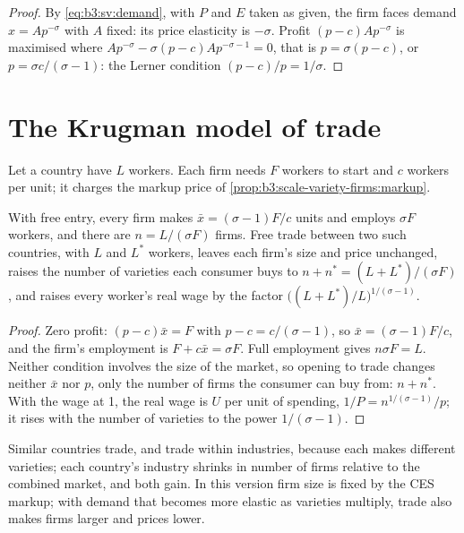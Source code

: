 \begin{proof}
By \eqref{eq:b3:sv:demand}, with $P$ and $E$ taken as given, the firm faces demand
$x = A p^{-\sigma}$ with $A$ fixed: its price elasticity is $-\sigma$. Profit
$(p - c)Ap^{-\sigma}$ is maximised where $Ap^{-\sigma} - \sigma(p - c)Ap^{-\sigma - 1} = 0$,
that is $p = \sigma(p - c)$, or $p = \sigma c/(\sigma - 1)$: the Lerner condition $(p -
c)/p = 1/\sigma$.
\end{proof}

\section{The Krugman model of trade}\label{sec:b3:scale-variety-firms:krugman}

Let a country have $L$ workers. Each firm needs $F$ workers to start and $c$
workers per unit; it charges the markup price of
\cref{prop:b3:scale-variety-firms:markup}.

\begin{proposition}\label{prop:b3:scale-variety-firms:krugman}
With free entry, every firm makes $\bar x = (\sigma - 1)F/c$ units and employs
$\sigma F$ workers, and there are $n = L/(\sigma F)$ firms. Free trade between two
such countries, with $L$ and $L^*$ workers, leaves each firm's size and price
unchanged, raises the number of varieties each consumer buys to $n + n^* = (L +
L^*)/(\sigma F)$, and raises every worker's real wage by the factor $\bigl((L +
L^*)/L\bigr)^{1/(\sigma-1)}$.
\end{proposition}

\begin{proof}
Zero profit: $(p - c)\bar x = F$ with $p - c = c/(\sigma - 1)$, so $\bar x = (\sigma -
1)F/c$, and the firm's employment is $F + c\bar x = \sigma F$. Full employment gives
$n\sigma F = L$. Neither condition involves the size of the market, so opening to
trade changes neither $\bar x$ nor $p$, only the number of firms the consumer can
buy from: $n + n^*$. With the wage at 1, the real wage is $U$ per unit of spending,
$1/P = n^{1/(\sigma-1)}/p$; it rises with the number of varieties to the power
$1/(\sigma - 1)$.
\end{proof}

Similar countries trade, and trade within industries, because each makes
different varieties; each country's industry shrinks in number of firms
relative to the combined market, and both gain. In this version firm size is
fixed by the CES markup; with demand that becomes more elastic as varieties
multiply, trade also makes firms larger and prices lower.

